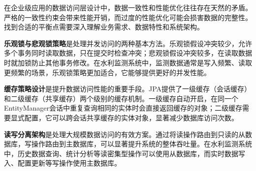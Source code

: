 在企业级应用的数据访问层设计中，数据一致性和性能优化往往存在天然的矛盾。严格的一致性约束会带来性能开销，而过度的性能优化可能会损害数据的完整性。找到合适的平衡点需要深入理解业务需求、数据特性和系统架构。

\textbf{乐观锁与悲观锁策略}是处理并发访问的两种基本方法。乐观锁假设冲突较少，允许多个事务同时读取数据，只在提交时检查冲突；悲观锁假设冲突较多，在读取数据时就加锁防止其他事务修改。在水利监测系统中，监测数据通常是写入频繁、读取更频繁的场景，乐观锁策略更加适合，它能够提供更好的并发性能。

\textbf{缓存策略设计}是提升数据访问性能的重要手段。JPA提供了一级缓存（会话缓存）和二级缓存（共享缓存）两个级别的缓存机制。一级缓存自动开启，在同一个EntityManager会话中重复查询相同的实体时会直接返回缓存的对象；二级缓存需要显式配置，它可以跨会话共享缓存的实体对象，显著减少数据库访问次数。

\textbf{读写分离架构}是处理大规模数据访问的有效方案。通过将读操作路由到只读的从数据库，写操作路由到主数据库，可以显著提升系统的整体吞吐量。在水利监测系统中，历史数据查询、统计分析等读密集型操作可以使用从数据库，而实时数据写入、配置更新等写操作使用主数据库。

